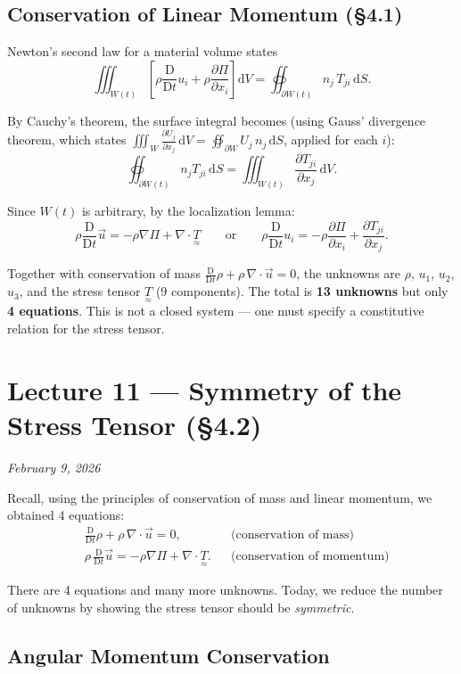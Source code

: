 \documentclass[11pt,a4paper]{article}
\newcommand{\D}{\mathrm{D}}
\newcommand{\Dt}{\frac{\D}{\D t}}
\newcommand{\pdx}[2]{\frac{\partial #1}{\partial #2}}
\newcommand{\uv}{\vec{u}}
\newcommand{\tens}[1]{\underset{\approx}{#1}}
\begin{document}
\subsection{Conservation of Linear Momentum (\S4.1)}

Newton's second law for a material volume states
\[
    \iiint_{W(t)} \left[\rho\Dt u_i + \rho\pdx{\Pi}{x_i}\right]\mathrm{d}V = \oiint_{\partial W(t)} n_j\,T_{ji}\,\mathrm{d}S.
\]

By Cauchy's theorem, the surface integral becomes (using Gauss' divergence theorem, which states $\iiint_W \frac{\partial U_j}{\partial x_j}\,\mathrm{d}V = \oiint_{\partial W} U_j\,n_j\,\mathrm{d}S$, applied for each $i$):
\[
    \oiint_{\partial W(t)} n_j T_{ji} \, \mathrm{d}S
    = \iiint_{W(t)} \pdx{T_{ji}}{x_j} \, \mathrm{d}V.
\]

Since $W(t)$ is arbitrary, by the localization lemma:
\[
    \boxed{\rho \Dt\uv = -\rho\nabla\Pi + \nabla \cdot \tens{T}}
    \qquad \text{or} \qquad
    \boxed{\rho \Dt u_i = -\rho\pdx{\Pi}{x_i} + \pdx{T_{ji}}{x_j}.}
\]

Together with conservation of mass $\Dt\rho + \rho\,\nabla\cdot\uv = 0$, the unknowns are $\rho$, $u_1$, $u_2$, $u_3$, and the stress tensor $\tens{T}$ (9 components). The total is \textbf{13 unknowns} but only \textbf{4 equations}. This is not a closed system --- one must specify a constitutive relation for the stress tensor.

\section{Lecture 11 --- Symmetry of the Stress Tensor (\S4.2)}
\textit{February 9, 2026}

Recall, using the principles of conservation of mass and linear momentum, we obtained 4 equations:
\begin{align*}
    &\Dt\rho + \rho\,\nabla\cdot\uv = 0, && \text{(conservation of mass)}\\
    &\rho\,\Dt\uv = -\rho\nabla\Pi + \nabla\cdot\tens{T}. && \text{(conservation of momentum)}
\end{align*}

There are 4 equations and many more unknowns. Today, we reduce the number of unknowns by showing the stress tensor should be \emph{symmetric}.

\subsection{Angular Momentum Conservation}
\end{document}

